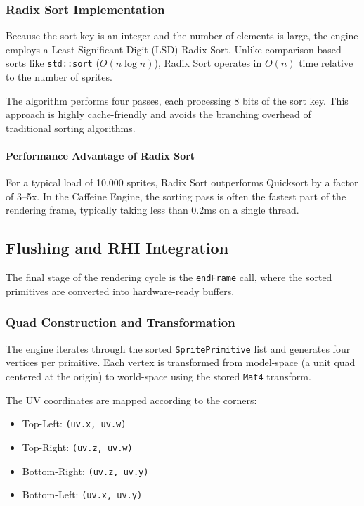 \subsubsection{Radix Sort Implementation}

Because the sort key is an integer and the number of elements is large, the engine employs a Least Significant Digit (LSD) Radix Sort. Unlike comparison-based sorts like \texttt{std::sort} ($O(n \log n)$), Radix Sort operates in $O(n)$ time relative to the number of sprites.

The algorithm performs four passes, each processing 8 bits of the sort key. This approach is highly cache-friendly and avoids the branching overhead of traditional sorting algorithms.


\paragraph{Performance Advantage of Radix Sort}

For a typical load of 10,000 sprites, Radix Sort outperforms Quicksort by a factor of 3--5x. In the Caffeine Engine, the sorting pass is often the fastest part of the rendering frame, typically taking less than 0.2ms on a single thread.



\subsection{Flushing and RHI Integration}

The final stage of the rendering cycle is the \texttt{endFrame} call, where the sorted primitives are converted into hardware-ready buffers.

\subsubsection{Quad Construction and Transformation}

The engine iterates through the sorted \texttt{SpritePrimitive} list and generates four vertices per primitive. Each vertex is transformed from model-space (a unit quad centered at the origin) to world-space using the stored \texttt{Mat4} transform.

The UV coordinates are mapped according to the corners:
\begin{itemize}
    \item Top-Left: \texttt{(uv.x, uv.w)}
    \item Top-Right: \texttt{(uv.z, uv.w)}
    \item Bottom-Right: \texttt{(uv.z, uv.y)}
    \item Bottom-Left: \texttt{(uv.x, uv.y)}
\end{itemize}


